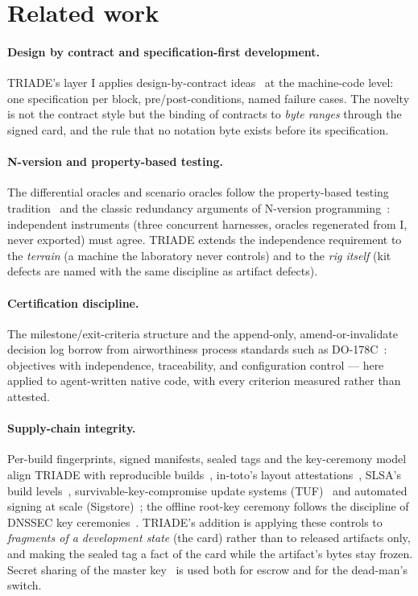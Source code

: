 \documentclass[11pt,a4paper]{article}
\begin{document}
\section{Related work}\label{sec:related}

\paragraph{Design by contract and specification-first development.}
TRIADE's layer I applies design-by-contract ideas~\cite{meyer1992} at the
machine-code level: one specification per block, pre/post-conditions,
named failure cases. The novelty is not the contract style but the
binding of contracts to \emph{byte ranges} through the signed card, and
the rule that no notation byte exists before its specification.

\paragraph{N-version and property-based testing.} The differential
oracles and scenario oracles follow the property-based testing
tradition~\cite{claessen2000} and the classic redundancy arguments of
N-version programming~\cite{avizienis1985}: independent instruments (three
concurrent harnesses, oracles regenerated from I, never exported) must
agree. TRIADE extends the independence requirement to the \emph{terrain}
(a machine the laboratory never controls) and to the \emph{rig itself}
(kit defects are named with the same discipline as artifact defects).

\paragraph{Certification discipline.} The milestone/exit-criteria
structure and the append-only, amend-or-invalidate decision log borrow
from airworthiness process standards such as
DO-178C~\cite{do178c}: objectives with independence, traceability, and
configuration control --- here applied to agent-written native code, with
every criterion measured rather than attested.

\paragraph{Supply-chain integrity.} Per-build fingerprints, signed
manifests, sealed tags and the key-ceremony model align TRIADE with
reproducible builds~\cite{lamb2022}, in-toto's layout
attestations~\cite{intoto2019}, SLSA's build levels~\cite{slsa},
survivable-key-compromise update systems (TUF)~\cite{tuf2010} and
automated signing at scale (Sigstore)~\cite{sigstore2022}; the offline
root-key ceremony follows the discipline of DNSSEC key
ceremonies~\cite{rfc4033}. TRIADE's addition is applying these controls
to \emph{fragments of a development state} (the card) rather than to
released artifacts only, and making the sealed tag a fact of the card
while the artifact's bytes stay frozen. Secret sharing of the master
key~\cite{shamir1979} is used both for escrow and for the dead-man's
switch.
\end{document}

